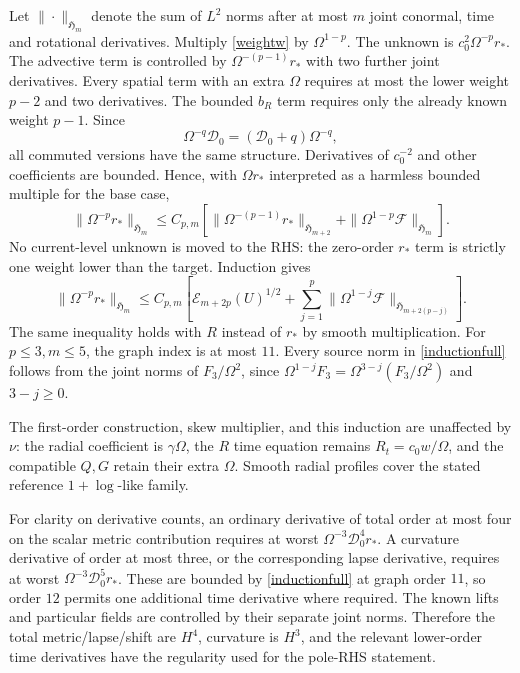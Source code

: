 Let $\|\cdot\|_{\mathfrak H_m}$ denote the sum of $L^2$ norms after at most $m$ joint conormal, time and rotational derivatives. Multiply \eqref{weightw} by $\Omega^{1-p}$. The unknown is $c_0^2\Omega^{-p}r_*$. The advective term is controlled by $\Omega^{-(p-1)}r_*$ with two further joint derivatives. Every spatial term with an extra $\Omega$ requires at most the lower weight $p-2$ and two derivatives. The bounded $b_R$ term requires only the already known weight $p-1$. Since
\[
 \Omega^{-q}\mathcal D_0=(\mathcal D_0+q)\Omega^{-q},
\]
all commuted versions have the same structure. Derivatives of $c_0^{-2}$ and other coefficients are bounded. Hence, with $\Omega r_*$ interpreted as a harmless bounded multiple for the base case,
\begin{equation}
 \|\Omega^{-p}r_*\|_{\mathfrak H_m}
 \le C_{p,m}\left[
 \|\Omega^{-(p-1)}r_*\|_{\mathfrak H_{m+2}}
 +\|\Omega^{1-p}\mathcal F\|_{\mathfrak H_m}\right].\label{induction}
\end{equation}
No current-level unknown is moved to the RHS: the zero-order $r_*$ term is strictly one weight lower than the target. Induction gives
\begin{equation}
 \|\Omega^{-p}r_*\|_{\mathfrak H_m}
 \le C_{p,m}\left[
 \mathcal E_{m+2p}(U)^{1/2}
 +\sum_{j=1}^p
 \|\Omega^{1-j}\mathcal F\|_{\mathfrak H_{m+2(p-j)}}
 \right].\label{inductionfull}
\end{equation}
The same inequality holds with $R$ instead of $r_*$ by smooth multiplication. For $p\le3,m\le5$, the graph index is at most $11$. Every source norm in \eqref{inductionfull} follows from the joint norms of $F_3/\Omega^2$, since $\Omega^{1-j}F_3=\Omega^{3-j}(F_3/\Omega^2)$ and $3-j\ge0$.

The first-order construction, skew multiplier, and this induction are unaffected by $\nu$: the radial coefficient is $\gamma\Omega$, the $R$ time equation remains $R_t=c_0w/\Omega$, and the compatible $Q,G$ retain their extra $\Omega$. Smooth radial profiles cover the stated reference $1+\log$-like family.

For clarity on derivative counts, an ordinary derivative of total order at most four on the scalar metric contribution requires at worst $\Omega^{-3}\mathcal D_0^4r_*$. A curvature derivative of order at most three, or the corresponding lapse derivative, requires at worst $\Omega^{-3}\mathcal D_0^5r_*$. These are bounded by \eqref{inductionfull} at graph order $11$, so order $12$ permits one additional time derivative where required. The known lifts and particular fields are controlled by their separate joint norms. Therefore the total metric/lapse/shift are $H^4$, curvature is $H^3$, and the relevant lower-order time derivatives have the regularity used for the pole-RHS statement.

